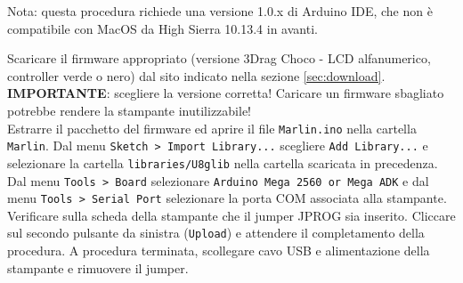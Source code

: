 \documentclass[12pt]{article}
\begin{document}
	Nota: questa procedura richiede una versione 1.0.x di Arduino IDE, che non è compatibile con MacOS da High Sierra 10.13.4 in avanti.

	Scaricare il firmware appropriato (versione 3Drag Choco - LCD alfanumerico, controller verde o nero) dal sito indicato nella sezione \ref{sec:download}.\\
	
	\textbf{IMPORTANTE}: scegliere la versione corretta! Caricare un firmware sbagliato potrebbe rendere la stampante inutilizzabile!\\
	
	Estrarre il pacchetto del firmware ed aprire il file \texttt{Marlin.ino} nella cartella \texttt{Marlin}. Dal menu \texttt{Sketch > Import Library...} scegliere \texttt{Add Library...} e selezionare la cartella \texttt{libraries/U8glib} nella cartella scaricata in precedenza.
	Dal menu \texttt{Tools > Board} selezionare \texttt{Arduino Mega 2560 or Mega ADK} e dal menu \texttt{Tools > Serial Port} selezionare la porta COM associata alla stampante. Verificare sulla scheda della stampante che il jumper JPROG sia inserito. Cliccare sul secondo pulsante da sinistra (\texttt{Upload}) e attendere il completamento della procedura. 
	A procedura terminata, scollegare cavo USB e alimentazione della stampante e rimuovere il jumper.
\end{document}
